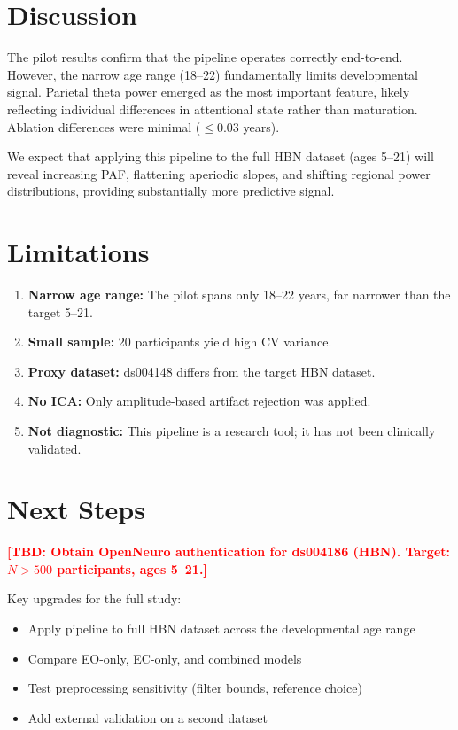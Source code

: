 \documentclass[12pt, a4paper]{article}
\newcommand{\tbd}[1]{\textcolor{red}{\textbf{[TBD: #1]}}}
\begin{document}
\section{Discussion}

The pilot results confirm that the pipeline operates correctly end-to-end. However, the narrow age range (18--22) fundamentally limits developmental signal. Parietal theta power emerged as the most important feature, likely reflecting individual differences in attentional state rather than maturation. Ablation differences were minimal ($\leq$0.03 years).

We expect that applying this pipeline to the full HBN dataset (ages 5--21) will reveal increasing PAF, flattening aperiodic slopes, and shifting regional power distributions, providing substantially more predictive signal.

\section{Limitations}

\begin{enumerate}
    \item \textbf{Narrow age range:} The pilot spans only 18--22 years, far narrower than the target 5--21.
    \item \textbf{Small sample:} 20 participants yield high CV variance.
    \item \textbf{Proxy dataset:} ds004148 differs from the target HBN dataset.
    \item \textbf{No ICA:} Only amplitude-based artifact rejection was applied.
    \item \textbf{Not diagnostic:} This pipeline is a research tool; it has not been clinically validated.
\end{enumerate}

\section{Next Steps}

\tbd{Obtain OpenNeuro authentication for ds004186 (HBN). Target: $N > 500$ participants, ages 5--21.}

Key upgrades for the full study:
\begin{itemize}
    \item Apply pipeline to full HBN dataset across the developmental age range
    \item Compare EO-only, EC-only, and combined models
    \item Test preprocessing sensitivity (filter bounds, reference choice)
    \item Add external validation on a second dataset
\end{itemize}
\end{document}
